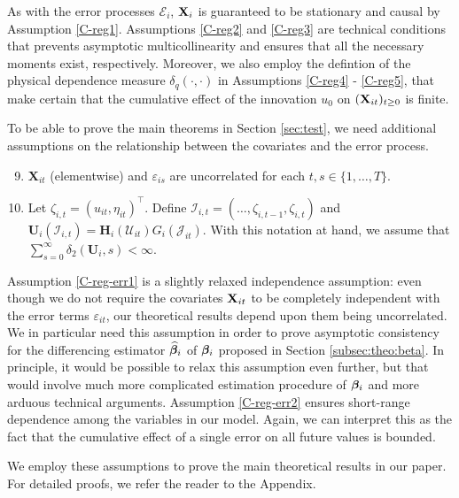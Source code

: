 \documentclass[a4paper,12pt]{article}
\begin{document}
As with the error processes $\mathcal{E}_i$, $\mathbf{X}_i$ is guaranteed to be stationary and causal by Assumption \ref{C-reg1}. Assumptions \ref{C-reg2} and \ref{C-reg3} are technical conditions that prevents asymptotic multicollinearity and ensures that all the necessary moments exist, respectively. Moreover, we also employ the defintion of the physical dependence measure $ \delta_{q}(\cdot, \cdot)$ in Assumptions \ref{C-reg4} - \ref{C-reg5}, that make certain that the cumulative effect of the innovation $u_0$ on $(\mathbf{X}_{it})_{t\geq 0}$ is finite. 



To be able to prove the main theorems in Section \ref{sec:test}, we need additional assumptions on the relationship between the covariates and the error process.

\begin{enumerate}[label=(C\arabic*),leftmargin=1.05cm]
\setcounter{enumi}{8}
\item \label{C-reg-err1} $\mathbf{X}_{it}$ (elementwise) and $\varepsilon_{is}$ are uncorrelated for each $t, s\in \{1, \ldots, T\}$.
\item \label{C-reg-err2} Let $\zeta_{i, t} = (u_{it}, \eta_{it})^\top$. Define $\mathcal{I}_{i, t} = (\ldots, \zeta_{i, t-1}, \zeta_{i, t})$ and $\mathbf{U}_i(\mathcal{I}_{i, t}) =  \mathbf{H}_i(\mathcal{U}_{it})G_i(\mathcal{J}_{it})$. With this notation at hand, we assume that $\sum_{s=0}^\infty \delta_2(\mathbf{U}_i, s)<\infty$.

\end{enumerate}
Assumption \ref{C-reg-err1} is a slightly relaxed independence assumption: even though we do not require the covariates $\mathbf{X}_{it}$ to be completely independent with the error terms $\varepsilon_{it}$, our theoretical results depend upon them being uncorrelated. We in particular need this assumption in order to prove asymptotic consistency for the differencing estimator $\widehat{\bm{\beta}}_i$ of $\bm{\beta}_i$ proposed in Section \ref{subsec:theo:beta}. In principle, it would be possible to relax this assumption even further, but that would involve much more complicated estimation procedure of $\bm{\beta}_i$ and more arduous technical arguments. Assumption \ref{C-reg-err2} ensures short-range dependence among the variables in our model. Again, we can interpret this as the fact that the cumulative effect of a single error on all future values is bounded.

We employ these assumptions to prove the main theoretical results in our paper. For detailed proofs, we refer the reader to the Appendix.
\end{document}

